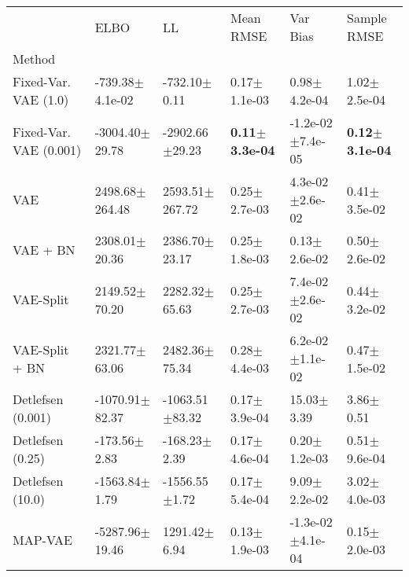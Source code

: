 \begin{tabular}{llllll}
\toprule
{} &                         ELBO &                           LL &                  Mean RMSE &                      Var Bias &                Sample RMSE \\
Method                 &                              &                              &                            &                               &                            \\
\midrule
Fixed-Var. VAE (1.0)   &          -739.38$\pm$4.1e-02 &             -732.10$\pm$0.11 &           0.17$\pm$1.1e-03 &              0.98$\pm$4.2e-04 &           1.02$\pm$2.5e-04 \\
Fixed-Var. VAE (0.001) &           -3004.40$\pm$29.78 &           -2902.66$\pm$29.23 &  \textbf{0.11$\pm$3.3e-04} &          -1.2e-02$\pm$7.4e-05 &  \textbf{0.12$\pm$3.1e-04} \\
VAE                    &           2498.68$\pm$264.48 &           2593.51$\pm$267.72 &           0.25$\pm$2.7e-03 &           4.3e-02$\pm$2.6e-02 &           0.41$\pm$3.5e-02 \\
VAE + BN               &            2308.01$\pm$20.36 &            2386.70$\pm$23.17 &           0.25$\pm$1.8e-03 &              0.13$\pm$2.6e-02 &           0.50$\pm$2.6e-02 \\
VAE-Split              &            2149.52$\pm$70.20 &            2282.32$\pm$65.63 &           0.25$\pm$2.7e-03 &           7.4e-02$\pm$2.6e-02 &           0.44$\pm$3.2e-02 \\
VAE-Split + BN         &            2321.77$\pm$63.06 &            2482.36$\pm$75.34 &           0.28$\pm$4.4e-03 &           6.2e-02$\pm$1.1e-02 &           0.47$\pm$1.5e-02 \\
Detlefsen (0.001)      &           -1070.91$\pm$82.37 &           -1063.51$\pm$83.32 &           0.17$\pm$3.9e-04 &                15.03$\pm$3.39 &              3.86$\pm$0.51 \\
Detlefsen (0.25)       &             -173.56$\pm$2.83 &             -168.23$\pm$2.39 &           0.17$\pm$4.6e-04 &              0.20$\pm$1.2e-03 &           0.51$\pm$9.6e-04 \\
Detlefsen (10.0)       &            -1563.84$\pm$1.79 &            -1556.55$\pm$1.72 &           0.17$\pm$5.4e-04 &              9.09$\pm$2.2e-02 &           3.02$\pm$4.0e-03 \\
MAP-VAE                &           -5287.96$\pm$19.46 &             1291.42$\pm$6.94 &           0.13$\pm$1.9e-03 &          -1.3e-02$\pm$4.1e-04 &           0.15$\pm$2.0e-03 \\

\end{tabular}

